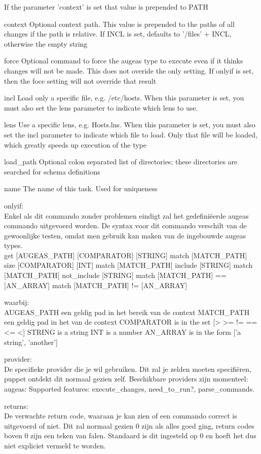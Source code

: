 If the parameter 'context' is set that value is prepended to PATH

context
Optional context path. This value is prepended to the paths of all changes if the path is relative. If INCL is set, defaults to '/files' + INCL, otherwise the empty string

force
Optional command to force the augeas type to execute even if it thinks changes will not be made. This does not overide the only setting. If onlyif is set, then the foce setting will not override that result

incl
Load only a specific file, e.g. /etc/hosts. When this parameter is set, you must also set the lens parameter to indicate which lens to use.

lens
Use a specific lens, e.g. Hosts.lns. When this parameter is set, you must also set the incl parameter to indicate which file to load. Only that file will be loaded, which greatly speeds up execution of the type

load\_path
Optional colon separated list of directories; these directories are searched for schema definitions

name
The name of this task. Used for uniqueness

onlyif:\\
Enkel als dit commando zonder problemen eindigt zal het gedefini\"{e}erde augeas commando uitgevoerd worden. De syntax voor dit commando verschilt van de gewoonlijke testen, omdat men gebruik kan maken van de ingebouwde augeas types.\\
get [AUGEAS\_PATH] [COMPARATOR] [STRING]
match [MATCH\_PATH] size [COMPARATOR] [INT]
match [MATCH\_PATH] include [STRING]
match [MATCH\_PATH] not\_include [STRING]
match [MATCH\_PATH] == [AN\_ARRAY]
match [MATCH\_PATH] != [AN\_ARRAY]

waarbij:\\
AUGEAS\_PATH een geldig pad in het bereik van de context
MATCH\_PATH een geldig pad in het van de context
COMPARATOR is in the set [> >= != == <= <]
STRING is a string
INT is a number
AN\_ARRAY is in the form ['a string', 'another']

provider:\\
De specifieke provider die je wil gebruiken. Dit zal je zelden moeten specifi\"{e}ren, puppet ontdekt dit normaal gezien zelf. Beschikbare providers zijn momenteel:\\
augeas: Supported features: execute\_changes, need\_to\_run?, parse\_commands.

returns:\\
De verwachte return code, waaraan je kan zien of een commando correct is uitgevoerd of niet. Dit zal normaal gezien 0 zijn als alles goed ging, return codes boven 0 zijn een teken van falen. Standaard is dit ingesteld op 0 en hoeft het dus niet expliciet vermeld te worden.

